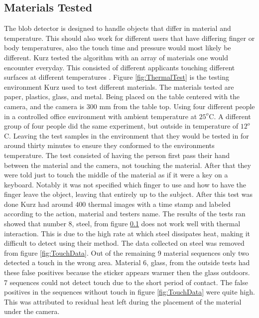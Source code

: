 \documentclass{sig-alternate}
\begin{document}
\subsection{Materials Tested}
\label{Materials Tested}
The blob detector is designed to handle objects that differ in material and temperature. This should also work for different users that have differing finger or body temperatures, also the touch time and pressure would most likely be different. Kurz tested the algorithm with an array of materials one would encounter everyday. This consisted of different applicants touching different surfaces at different temperatures \cite{3D}. Figure \ref{fig:ThermalTest} is the testing environment Kurz used to test different materials. The materials tested are paper, plastics, glass, and metal. Being placed on the table centered with the camera, and the camera is 300 mm from the table top. Using four different people in a controlled office environment with ambient temperature at \(25^o\)C. A different group of four people did the same experiment, but outside in temperature of \(12^o\)C. Leaving the test samples in the environment that they would be tested in for around thirty minutes to ensure they conformed to the environments temperature. The test consisted of having the person first pass their hand between the material and the camera, not touching the material. After that they were told just to touch the middle of the material as if it were a key on a keyboard. Notably it was not specified which finger to use and how to have the finger leave the object, leaving that entirely up to the subject. After this test was done Kurz had around 400 thermal images with a time stamp and labeled according to the action, material and testers name. The results of the tests ran showed that number 8, steel, from figure \ref{Materials Tested} does not work well with thermal interaction. This is due to the high rate at which steel dissipates heat, making it difficult to detect using their method. The data collected on steel was removed from figure \ref{fig:TouchData}. Out of the remaining 9 material sequences only two detected a touch in the wrong area. Material 6, glass, from the outside tests had these false positives because the sticker appears warmer then the glass outdoors. 7 sequences could not detect touch due to the short period of contact. The false positives in the sequences without touch in figure \ref{fig:TouchData} were quite high. This was attributed to residual heat left during the placement of the material under the camera. 
\end{document}
